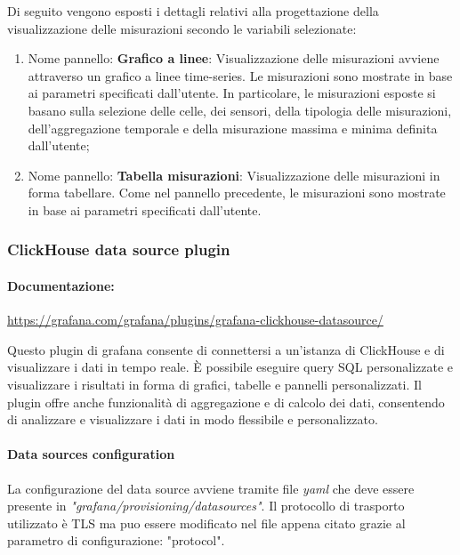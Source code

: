 Di seguito vengono esposti i dettagli relativi alla progettazione della visualizzazione delle misurazioni secondo le variabili selezionate:
\begin{enumerate}
    \item Nome pannello: \textbf{Grafico a linee}: Visualizzazione delle misurazioni avviene attraverso un grafico a linee time-series. Le misurazioni sono mostrate in base ai parametri specificati dall’utente. In particolare, le misurazioni esposte si basano sulla selezione delle celle, dei sensori, della tipologia delle misurazioni, dell’aggregazione temporale e della misurazione massima e minima definita dall’utente;
    \item Nome pannello: \textbf{Tabella misurazioni}: Visualizzazione delle misurazioni in forma tabellare. Come nel pannello precedente, le misurazioni sono mostrate in base ai parametri specificati dall'utente.
\end{enumerate}

\subsubsection{ClickHouse data source plugin} \label{sec:click_plugin}
\paragraph{Documentazione:}
\href{https://grafana.com/grafana/plugins/grafana-clickhouse-datasource/}{https://grafana.com/grafana/plugins/grafana-clickhouse-datasource/}

Questo plugin di grafana consente di connettersi a un'istanza di ClickHouse e di visualizzare i dati in tempo reale. È possibile eseguire query SQL personalizzate e visualizzare i risultati in forma di grafici, tabelle e pannelli personalizzati. Il plugin offre anche funzionalità di aggregazione e di calcolo dei dati, consentendo di analizzare e visualizzare i dati in modo flessibile e personalizzato.

\paragraph{Data sources configuration}
La configurazione del data source avviene tramite file \textit{yaml} che deve essere presente in \textit{"grafana/provisioning/datasources"}.
Il protocollo di trasporto utilizzato è TLS ma puo essere modificato nel file appena citato grazie al parametro di configurazione: "protocol".

